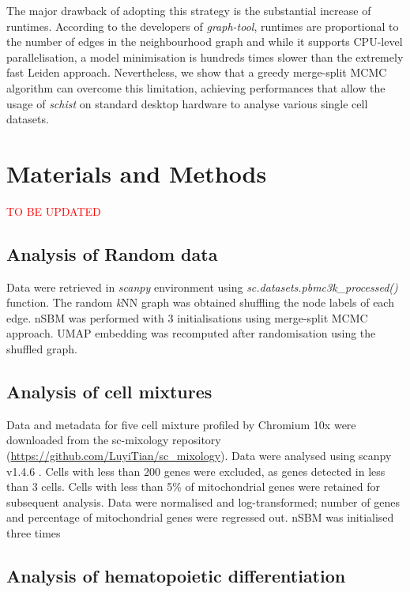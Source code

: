 \documentclass[10pt]{article}
\begin{document}
The major drawback of adopting this strategy is the substantial increase of runtimes. According to the developers of \emph{graph-tool}, runtimes are proportional to the number of edges in the neighbourhood graph and while it supports CPU-level parallelisation, a model minimisation is hundreds times slower than the extremely fast Leiden approach. Nevertheless, we show that a greedy merge-split MCMC algorithm can overcome this limitation, achieving performances that allow the usage of \emph{schist} on standard desktop hardware to analyse various single cell datasets.


\section*{Materials and Methods}

\textcolor{red}{TO BE UPDATED}

\subsection*{Analysis of Random data}
Data were retrieved in \emph{scanpy} environment using \emph{sc.datasets.pbmc3k\_processed()} function. The random \emph{k}NN graph was obtained shuffling the node labels of each edge. nSBM was performed with 3 initialisations using merge-split MCMC approach. UMAP embedding was recomputed after randomisation using the shuffled graph.


\subsection*{Analysis of cell mixtures}

Data and metadata for five cell mixture profiled by Chromium 10x were downloaded from the sc-mixology repository (\href{https://github.com/LuyiTian/sc_mixology}{https:/\slash github.com\slash LuyiTian\slash sc\_mixology}). Data were analysed using scanpy v1.4.6 \cite{wolf_2018}. Cells with less than 200 genes were excluded, as genes detected in less than 3 cells. Cells with less than 5\% of mitochondrial genes were retained for subsequent analysis. Data were normalised and log-transformed; number of genes and percentage of mitochondrial genes were regressed out. nSBM was initialised three times

\subsection*{Analysis of hematopoietic differentiation}
\end{document}
